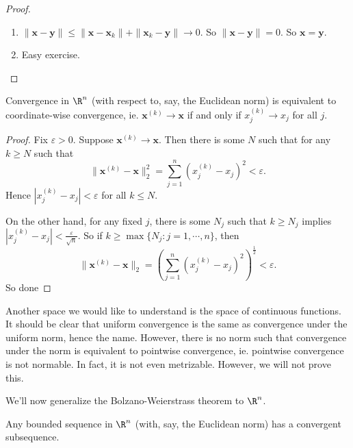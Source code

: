 \documentclass[a4paper]{article}
\begin{document}
\begin{proof}\leavevmode
  \begin{enumerate}
    \item $\|\mathbf{x} - \mathbf{y}\| \leq \|\mathbf{x} - \mathbf{x}_k\| + \|\mathbf{x}_k - \mathbf{y}\| \to 0$. So $\|\mathbf{x} - \mathbf{y}\| = 0$. So $\mathbf{x} = \mathbf{y}$.
    \item Easy exercise.
  \end{enumerate}
\end{proof}

\begin{prop}
  Convergence in $\R^n$ (with respect to, say, the Euclidean norm) is equivalent to coordinate-wise convergence, ie. $\mathbf{x}^{(k)} \to \mathbf{x}$ if and only if $x^{(k)}_j \to x_j$ for all $j$.
\end{prop}

\begin{proof}
  Fix $\varepsilon > 0$. Suppose $\mathbf{x}^{(k)} \to \mathbf{x}$. Then there is some $N$ such that for any $k \geq N$ such that
  \[
    \|\mathbf{x}^{(k)} - \mathbf{x}\|_2^2 = \sum_{j = 1}^n (x_j^{(k)} - x_j)^2 < \varepsilon.
  \]
  Hence $|x_j^{(k)} - x_j| < \varepsilon$ for all $k \leq N$.

  On the other hand, for any fixed $j$, there is some $N_j$ such that $k \geq N_j$ implies $|x_j^{(k)} - x_j| < \frac{\varepsilon}{\sqrt{n}}$. So if $k \geq \max\{N_j: j = 1, \cdots, n\}$, then
  \[
    \|\mathbf{x}^{(k)} - \mathbf{x}\|_2 = \left(\sum_{j = 1}^n (x_j^{(k)} - x_j)^2\right)^{\frac{1}{2}} < \varepsilon.
  \]
  So done
\end{proof}

Another space we would like to understand is the space of continuous functions. It should be clear that uniform convergence is the same as convergence under the uniform norm, hence the name. However, there is no norm such that convergence under the norm is equivalent to pointwise convergence, ie. pointwise convergence is not normable. In fact, it is not even metrizable. However, we will not prove this.

We'll now generalize the Bolzano-Weierstrass theorem to $\R^n$.
\begin{thm}
  Any bounded sequence in $\R^n$ (with, say, the Euclidean norm) has a convergent subsequence.
\end{thm}
\end{document}

